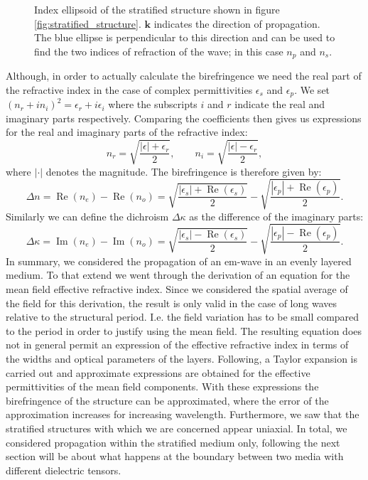 \begin{figure}[h]
    \centering
    
    \caption{Index ellipsoid of the stratified structure shown in figure \ref{fig:stratified_structure}. $\bm{k}$ indicates the direction of propagation. The blue ellipse is perpendicular to this direction and can be used to find the two indices of refraction of the wave; in this case $n_{p}$ and $n_{s}$.}
    \label{fig:index_ellipse}
\end{figure}
Although, in order to actually calculate the birefringence we need the real part of the refractive index in the case of complex permittivities $\epsilon_{s}$ and $\epsilon_{p}$. We set $(n_r+in_i)^2 = \epsilon_r + i\epsilon_i$ where the subscripts $i$ and $r$ indicate the real and imaginary parts respectively. Comparing the coefficients then gives us expressions for the real and imaginary parts of the refractive index:
\begin{equation}
    n_r = \sqrt{\frac{|\epsilon|+\epsilon_r}{2}}, 
    \qquad 
    n_i = \sqrt{\frac{|\epsilon|-\epsilon_r}{2}},
\end{equation}
where $|\cdot|$ denotes the magnitude. The birefringence is therefore given by:
\begin{equation}
    \label{eq:form_bf}
    \Delta n = \operatorname{Re}(n_e) - \operatorname{Re}(n_o) = \sqrt{\frac{|\epsilon_s|+\operatorname{Re}(\epsilon_s)}{2}} - \sqrt{\frac{|\epsilon_p|+\operatorname{Re}(\epsilon_p)}{2}}.
\end{equation}
Similarly we can define the dichroism $\Delta \kappa$ as the difference of the imaginary parts:
\begin{equation}
    \Delta \kappa = \operatorname{Im}(n_e) - \operatorname{Im}(n_o) = \sqrt{\frac{|\epsilon_s|-\operatorname{Re}(\epsilon_s)}{2}} - \sqrt{\frac{|\epsilon_p|-\operatorname{Re}(\epsilon_p)}{2}}.
\end{equation}
In summary, we considered the propagation of an em-wave in an evenly layered medium. To that extend we went through the derivation of an equation for the mean field effective refractive index. Since we considered the spatial average of the field for this derivation, the result is only valid in the case of long waves relative to the structural period. I.e. the field variation has to be small compared to the period in order to justify using the mean field. The resulting equation does not in general permit an expression of the effective refractive index in terms of the widths and optical parameters of the layers. Following, a Taylor expansion is carried out and approximate expressions are obtained for the effective permittivities of the mean field components. With these expressions the birefringence of the structure can be approximated, where the error of the approximation increases for increasing wavelength. Furthermore, we saw that the stratified structures with which we are concerned appear uniaxial. In total, we considered propagation within the stratified medium only, following the next section will be about what happens at the boundary between two media with different dielectric tensors.

